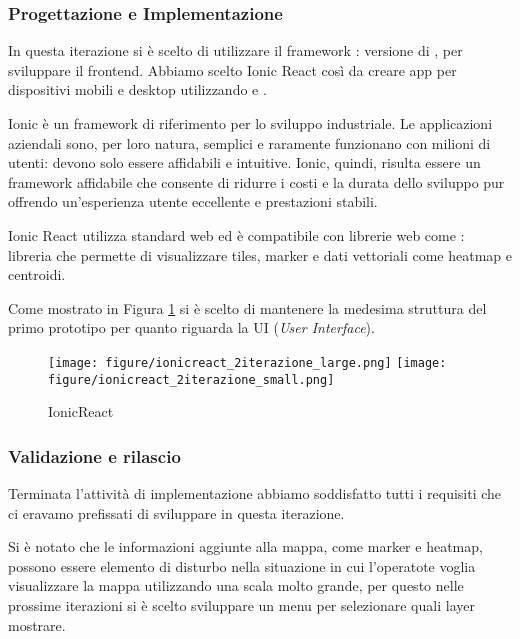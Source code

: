 \documentclass[a4paper]{report}
\begin{document}
\subsubsection*{{Progettazione e Implementazione}}
In questa iterazione si è scelto di utilizzare il framework \cite*{IonicReact}: versione \cite*{React} di \cite*{Ionic}, per sviluppare il frontend. Abbiamo scelto Ionic React così da creare app per dispositivi mobili e desktop utilizzando \cite*{Capacitor} e \cite*{Electron}. 

Ionic è un framework di riferimento per lo sviluppo industriale. Le applicazioni aziendali sono, per loro natura, semplici e raramente funzionano con milioni di utenti: devono solo essere affidabili e intuitive. Ionic, quindi, risulta essere un framework affidabile che consente di ridurre i costi e la durata dello sviluppo pur offrendo un'esperienza utente eccellente e prestazioni stabili. \cite*{IonicReactArticle}

Ionic React utilizza standard web ed è compatibile con librerie web come \cite*{OpenLayers}: libreria che permette di visualizzare tiles, marker e dati vettoriali come heatmap e centroidi. 

Come mostrato in Figura \ref{IonicReact_2iterazione} si è scelto di mantenere la medesima struttura del primo prototipo per quanto riguarda la UI (\textit{User Interface}).
\begin{figure}[tbp]
    \centering
    \texttt{[image: figure/ionicreact\_2iterazione\_large.png]}\hfill
    \texttt{[image: figure/ionicreact\_2iterazione\_small.png]}\hfill

    \caption{IonicReact}
    \label{IonicReact_2iterazione}
\end{figure}

\subsubsection*{{Validazione e rilascio}}
Terminata l'attività di implementazione abbiamo soddisfatto tutti i requisiti che ci eravamo prefissati di sviluppare in questa iterazione. 

Si è notato che le informazioni aggiunte alla mappa, come marker e heatmap, possono essere elemento di disturbo nella situazione in cui l'operatote voglia visualizzare la mappa utilizzando una scala molto grande, per questo nelle prossime iterazioni si è scelto sviluppare un menu per selezionare quali layer mostrare.
\end{document}
